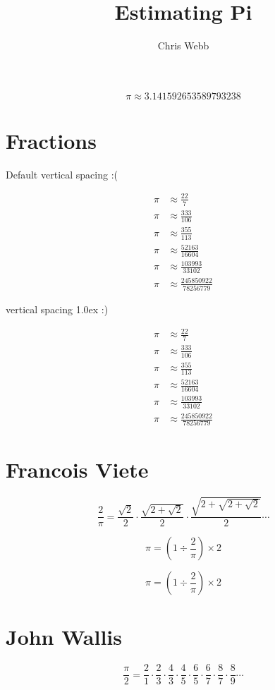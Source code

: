 \documentclass{article}
\title{Estimating Pi}
\author{Chris Webb}
\begin{document}
\maketitle


\[\pi \approx 3.141592653589793238 \]


\section{Fractions}

Default vertical spacing :(

\begin{align*}
\pi &\approx \frac{22}{7} \\
\pi &\approx \frac{333}{106} \\
\pi &\approx \frac{355}{113} \\
\pi &\approx \frac{52163}{16604} \\
\pi &\approx \frac{103993}{33102} \\
\pi &\approx \frac{245850922}{78256779}
\end{align*}

vertical spacing 1.0ex :)

\begin{align*}
\pi &\approx \frac{22}{7} \\[1.0ex]
\pi &\approx \frac{333}{106} \\[1.0ex]
\pi &\approx \frac{355}{113} \\[1.0ex]
\pi &\approx \frac{52163}{16604} \\[1.0ex]
\pi &\approx \frac{103993}{33102} \\[1.0ex]
\pi &\approx \frac{245850922}{78256779}
\end{align*}


\section{Francois Viete}

\[
\frac{2}{\pi} = 
\frac{\sqrt{2}}{2} \cdot 
\frac{\sqrt{2+\sqrt{2}}}{2} \cdot
\frac{\sqrt{2+\sqrt{2+\sqrt{2}}}}{2} 
\cdots
\]

\[
\pi = (1 \div \frac{2}{\pi}) \times 2
\]

\[
\pi = \left( 1 \div \frac{2}{\pi} \right) \times 2
\]


\section{John Wallis}

\[
\frac{\pi}{2} = 
\frac{2}{1} \cdot
\frac{2}{3} \cdot
\frac{4}{3} \cdot
\frac{4}{5} \cdot
\frac{6}{5} \cdot
\frac{6}{7} \cdot
\frac{8}{7} \cdot
\frac{8}{9}
\cdots
\]
\end{document}

